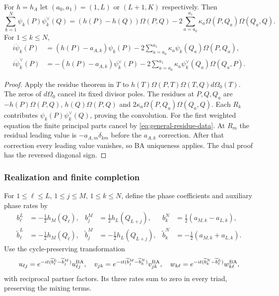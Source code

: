 \begin{lemma}
\label{lem:general-kernel-convolution}
For $h=h_A$ let $(a_0,a_1)=(1,L)$ or $(L+1,K)$ respectively. Then
\begin{equation}\label{eq:general-kernel-convolution}
 \sum_{k=1}^{N}\psi_k(P)\psi_k^\vee(Q)
 =(h(P)-h(Q))\Omega(P,Q)
 -2\sum_{a=a_0}^{a_1}\kappa_a\Omega(P,Q_a)\Omega(Q_a,Q).
\end{equation}
For $1\leq k\leq N$,
\begin{equation}\label{eq:general-weighted-BA}
\begin{aligned}
 i\dot\psi_k(P)&=(h(P)-a_{A,k})\psi_k(P)
       -2\sum_{a=a_0}^{a_1}\kappa_a\psi_k(Q_a)\Omega(P,Q_a),\\
 i\dot\psi_k^\vee(P)&=-(h(P)-a_{A,k})\psi_k^\vee(P)
       -2\sum_{a=a_0}^{a_1}\kappa_a\psi_k^\vee(Q_a)\Omega(Q_a,P).
\end{aligned}
\end{equation}
\end{lemma}
\begin{proof}
Apply the residue theorem in $T$ to
$h(T)\Omega(P,T)\Omega(T,Q)d\Omega_0(T)$.
The zeros of $d\Omega_0$ cancel its fixed divisor poles. The residues
at $P,Q,Q_a$ are $-h(P)\Omega(P,Q)$, $h(Q)\Omega(P,Q)$ and
$2\kappa_a\Omega(P,Q_a)\Omega(Q_a,Q)$. Each $R_k$ contributes
$\psi_k(P)\psi_k^\vee(Q)$, proving the convolution.
For the first weighted equation the finite principal parts cancel
by \cref{eq:general-residue-data}. At $R_m$ the residual leading
value is $-a_{A,m}\delta_{km}$ before the $a_{A,k}$ correction.
After that correction every leading value vanishes, so BA uniqueness
applies. The dual proof has the reversed diagonal sign.
\end{proof}

\subsubsection{Realization and finite completion}

For $1\leq\ell\leq L$, $1\leq j\leq M$, $1\leq k\leq N$,
define the phase coefficients and auxiliary phase rates by
\begin{equation}\label{eq:general-phase-values}
\begin{aligned}
 b_{\ell}^L&=-\tfrac12h_M(Q_{\ell}),&
 b_j^M&=\tfrac12h_L(Q_{L+j}),&
 b_k^N&=\tfrac12(a_{M,k}-a_{L,k}),\\
 \widetilde b_{\ell}^L&=-\tfrac12h_M(Q_{\ell}),&
 \widetilde b_j^M&=-\tfrac12h_L(Q_{L+j}),&
 \widetilde b_k^N&=-\tfrac12(a_{M,k}+a_{L,k}).
\end{aligned}
\end{equation}
Use the cycle-preserving transformation
\begin{equation}\label{eq:multipoint-phase-gauge}
 u_{\ell j}=e^{-it(\widetilde b_{\ell}^L-\widetilde b_j^M)}u_{\ell j}^{\rm BA},\quad
 v_{jk}=e^{-it(\widetilde b_j^M-\widetilde b_k^N)}v_{jk}^{\rm BA},\quad
 w_{k\ell}=e^{-it(\widetilde b_k^N-\widetilde b_{\ell}^L)}w_{k\ell}^{\rm BA},
\end{equation}
with reciprocal partner factors. Its three rates sum to zero in
every triad, preserving the mixing terms.

